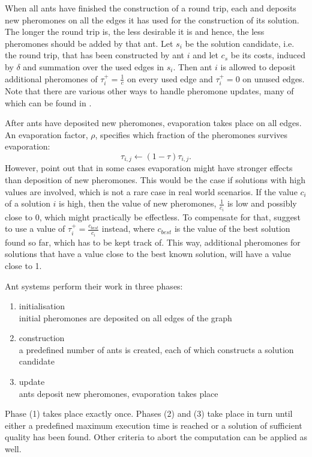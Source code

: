 When all ants have finished the construction of a round trip, each and deposits new pheromones on all the edges it has used for the construction of its solution. The longer the round trip is, the less desirable it is and hence, the less pheromones should be added by that ant. Let $s_i$ be the solution candidate, i.e. the round trip, that has been constructed by ant $i$ and let $c_s$ be its costs, induced by $\delta$ and summation over the used edges in $s_i$. Then ant $i$ is allowed to deposit additional pheromones of $\tau_i^+ = \frac{1}{c}$ on every used edge and $\tau_i^+ = 0$ on unused edges. Note that there are various other ways to handle pheromone updates, many of which can be found in \cite{Dorigo:2004:ACO:975277}.

After ants have deposited new pheromones, evaporation takes place on all edges. An evaporation factor, $\rho$, specifies which fraction of the pheromones survives evaporation:
\begin{equation}
  \label{eqn:evaporation}
  \tau_{i,j} \leftarrow \left( 1 - \tau \right) \tau_{i,j}.
\end{equation}
However, \cite{Bloecker} point out that in some cases evaporation might have stronger effects than deposition of new pheromones. This would be the case if solutions with high values are involved, which is not a rare case in real world scenarios. If the value $c_i$ of a solution $i$ is high, then the value of new pheromones, $\frac{1}{c_i}$ is low and possibly close to $0$, which might practically be effectless. To compensate for that, \cite{Bloecker} suggest to use a value of $\tau_i^+ = \frac{c_{best}}{c_i}$ instead, where $c_{best}$ is the value of the best solution found so far, which has to be kept track of. This way, additional pheromones for solutions that have a value close to the best known solution, will have a value close to 1.

Ant systems perform their work in three phases:
\begin{enumerate}
  \item initialisation \\
    initial pheromones are deposited on all edges of the graph
  \item construction \\
    a predefined number of ants is created, each of which constructs a solution candidate
  \item update \\
    ants deposit new pheromones, evaporation takes place
\end{enumerate}
Phase (1) takes place exactly once. Phases (2) and (3) take place in turn until either a predefined maximum execution time is reached or a solution of sufficient quality has been found. Other criteria to abort the computation can be applied as well.

